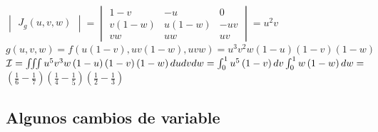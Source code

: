 \documentclass{report}
\begin{document}
{      $\begin{vmatrix}J_g\left(u,v,w\right)\end{vmatrix}=
      \begin{vmatrix}
        1-v&                -u&                 0\\
        v\left(1-w\right)&  u\left(1-w\right)&  -uv\\
        vw&                 uw&                 uv
      \end{vmatrix}=u^2v$\\

      \vspace{0.2cm}$g\left(u,v,w\right)=f\left(u\left(1-v\right),uv\left(1-w\right),uvw\right)=u^3v^2w\left(1-u\right)\left(1-v\right)\left(1-w\right)$\\

      \vspace{0.2cm}$\mathcal{I}=\iiint u^5v^3w\left(1-u\right)\left(1-v\right)\left(1-w\right)dudvdw=\int_{0}^{1}u^5\left(1-v\right)dv\int_{0}^{1}w\left(1-w\right)dw=$
      $\left(\frac16-\frac17\right)\left(\frac14-\frac15\right)\left(\frac12-\frac13\right)$
    }
    \subsection{Algunos cambios de variable}
\end{document}
